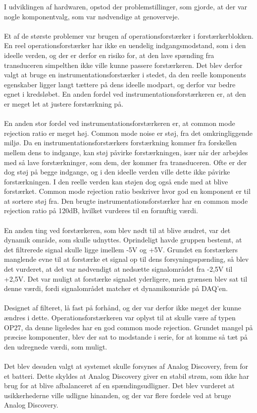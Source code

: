 I udviklingen af hardwaren, opstod der problemstillinger, som  gjorde, at der var nogle komponentvalg, som var nødvendige at genoverveje.\\
\\
Et af de største problemer var brugen af  operationsforstærker i forstærkerblokken. En reel operationsforstærker har ikke en uendelig indgangsmodstand, som i den ideelle verden, og der er derfor en risiko for, at den lave spænding fra transduceren simpelthen ikke ville kunne passere forstærkeren. Det blev derfor valgt at bruge en instrumentationsforstærker i stedet, da den reelle komponents egenskaber ligger langt tættere på dens ideelle modpart, og derfor var bedre egnet i kredsløbet. En anden fordel ved instrumentationsforstærkeren er, at den er meget let at justere forstærkning på.\\
\\
En anden stor fordel ved instrumentationsforstærkeren er, at common mode rejection ratio er meget høj. Common mode noise er støj, fra det omkringliggende miljø. Da en instrumentationsforstærkers forstærkning kommer fra forskellen mellem dens to indgange, kan støj påvirke forstærkningen, især når der arbejdes med så lave forstærkninger, som dem, der kommer fra transduceren. Ofte er der dog støj på begge indgange, og i den ideelle verden ville dette ikke påvirke forstærkningen. I den reelle verden kan støjen dog også ende med at blive forstærket. Common mode rejection ratio beskriver hvor god en komponent er til at sortere støj fra. Den brugte instrumentationsforstærker har en common mode rejection ratio på 120dB, hvilket vurderes til en fornuftig værdi. \\
\\
En anden ting ved forstærkeren, som blev nødt til at blive ændret, var det dynamik område, som skulle udnyttes. Oprindeligt havde gruppen bestemt, at det filtrerede signal skulle ligge imellem -5V og +5V. Grundet en forstærkers manglende evne til at forstærke et signal op til dens forsyningsspænding, så blev det vurderet, at det var nødvendigt at nedsætte signalområdet fra -2,5V til +2,5V. Det var muligt at forstærke signalet yderligere, men grænsen blev sat til denne værdi, fordi signalområdet matcher et dynamikområde på DAQ'en.\\ 
\\
Designet af filteret, lå fast på forhånd, og der var derfor ikke meget der kunne ændres i dette. Operationsforstærkeren var oplyst til at skulle være af typen OP27, da denne ligeledes har en god common mode rejection. Grundet mangel på præcise komponenter, blev der sat to modstande i serie, for at komme så tæt på den udregnede værdi, som muligt. \\
\\
Det blev desuden valgt at systemet skulle forsynes af Analog Discovery, frem for et batteri. Dette skyldes at Analog Discovery giver en stabil strøm, som ikke har brug for at blive afbalanceret af en spændingsudligner. Det blev vurderet at usikkerhederne ville udligne hinanden, og der var flere fordele ved at bruge Analog Discovery.\\


